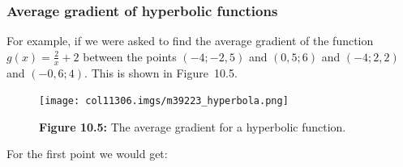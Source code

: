             \subsubsection{ Average gradient of hyperbolic functions}
            \nopagebreak
\label{m39223*id67324}For example, if we were asked to find the average gradient of the function $g\left(x\right)=\frac{2}{x}+2$ between the points $\left(-4;-2,5\right)$ and $\left(0,5;6\right)$ and $\left(-4;2,2\right)$ and $\left(-0,6;4\right)$. This is shown in Figure~10.5.
    \setcounter{subfigure}{0}
	\begin{figure}[H] %
    \begin{center}
    \label{m39223*uid32!!!underscore!!!media}\label{m39223*uid32!!!underscore!!!printimage}\texttt{[image: col11306.imgs/m39223\_hyperbola.png]} %
      \vspace{2pt}
    \vspace{\rubberspace}\par \begin{cnxcaption}
	  \small \textbf{Figure 10.5: }The average gradient for a hyperbolic function.
	\end{cnxcaption}
    \vspace{.1in}
    \end{center}
 \end{figure}       \par 
\label{m39223*id2322} For the first point we would get:
 \label{m39223*id196486}\nopagebreak\noindent{}
